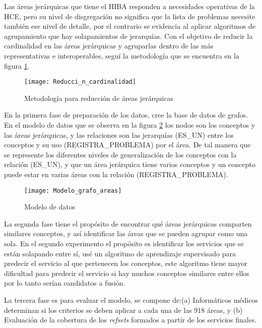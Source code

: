Las áreas jerárquicas que tiene el HIBA responden a necesidades operativas de la HCE, pero su nivel de disgregación no significa que la lista de problemas necesite también ese nivel de detalle, por el contrario se evidencia al aplicar algoritmos de agrupamiento que hay solapamientos de jerarquías. Con el objetivo de reducir la cardinalidad en las áreas jerárquicas y agruparlas dentro de las más representativas e interoperables, seguí la metodología que se encuentra en la figura \ref{fig:MetodologiaReduccionAreas}.


\begin{figure}[ht]
\caption{Metodología para reducción de áreas jerárquicas}
\label{fig:MetodologiaReduccionAreas}
\centering
\texttt{[image: Reducci\_n\_cardinalidad]}
\end{figure}

En la primera fase de preparación de los datos, cree la base de datos de grafos. En el modelo de datos que se observa en la figura \ref{fig:ModeloDatosAreas} los nodos son los conceptos y las áreas jerárquicas, y las relaciones son las jerarquías (ES\_UN) entre los conceptos y su uso (REGISTRA\_PROBLEMA)  por el área. De tal manera que se represente los diferentes niveles de generalización de los conceptos con la relación (ES\_UN), y que un área jerárquica tiene varios conceptos y un concepto puede estar en varias áreas con la relación (REGISTRA\_PROBLEMA). 

\begin{figure}[ht]
\caption{Modelo de datos}
\label{fig:ModeloDatosAreas}
\centering
\texttt{[image: Modelo\_grafo\_areas]}
\end{figure}

La segunda fase tiene el propósito de encontrar qué áreas jerárquicas comparten similares conceptos, y así identificar las áreas que se pueden agrupar como una sola. En el segundo experimento el propósito es identificar los servicios que se están solapando entre sí, usé un algoritmo de aprendizaje supervisado para predecir el servicio al que pertenecen los conceptos, este algoritmo tiene mayor dificultad para predecir el servicio si hay muchos conceptos similares entre ellos por lo tanto serían candidatos a fusión.

La tercera fase es para evaluar el modelo, se compone de:(a) Informáticos médicos determinan si los criterios se deben aplicar a cada una de las 918 áreas, y (b) Evaluación de la cobertura de los \textit{refsets} formados a partir de los servicios finales.

